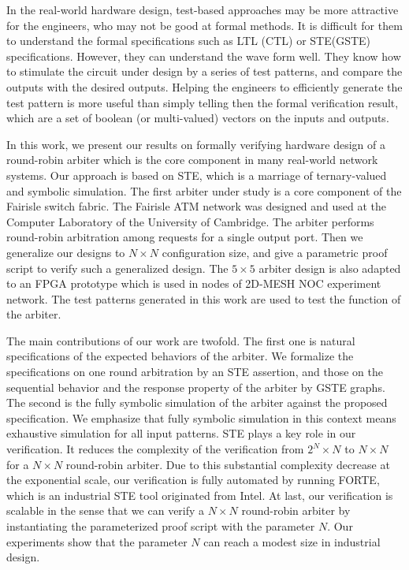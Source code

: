 \documentclass[final]{IEEEtran}
\begin{document}
In the real-world hardware design, test-based approaches may be more
attractive for the engineers, who may not be good at formal methods.
 It is difficult for them to understand the formal specifications
 such as LTL (CTL) or STE(GSTE) specifications. However, they can
 understand the wave form well. They know how to stimulate the
 circuit under design by a series of test patterns,  and compare the
  outputs with the desired outputs. Helping the engineers to
  efficiently generate the test pattern is more useful than simply telling then the formal verification result,
  which are a set of boolean
  (or multi-valued) vectors on the inputs and outputs.

In this work, we present our results on formally verifying hardware
design of a round-robin arbiter which is the core component in many
real-world network systems. Our approach is based on STE, which is a
marriage of ternary-valued and
symbolic simulation. The first arbiter under study  is a core component of the Fairisle %
switch fabric. %
The Fairisle ATM network was designed and used at the Computer
Laboratory of the University of Cambridge. The arbiter performs
round-robin arbitration among requests for a single output port.
Then we generalize our designs to $N \times N$ configuration size,
and give a parametric proof  script to verify such a generalized
design. The $5\times5$ arbiter design is also adapted to an FPGA
prototype  which is used in   nodes of 2D-MESH
NOC experiment network. The test patterns generated in this work are used to test the function of the arbiter. %



The main contributions of our work are twofold. The first one is
natural specifications of the expected behaviors of the arbiter. We
formalize the specifications on   one round arbitration by an STE
assertion, and those on the sequential behavior  and the response
property of the arbiter by GSTE graphs. The second is the fully
symbolic simulation of the arbiter against the proposed
specification. We emphasize that   fully symbolic simulation in this
context means   exhaustive simulation for all   input patterns. STE
plays a key role in our verification. It reduces the complexity of
the verification from $2^{N}\times N$ to $N\times N$ for a $N\times
N$ round-robin arbiter. Due to this substantial complexity decrease
at the exponential scale, our verification is fully automated by
running FORTE, which is an industrial STE tool originated from
Intel. At last, our verification is scalable in the sense that we
can verify a $N \times N$ round-robin arbiter by instantiating the
parameterized proof script
with the parameter $N$. %
Our experiments show that the parameter $N$ can reach a modest size
in   industrial design.
\end{document}
